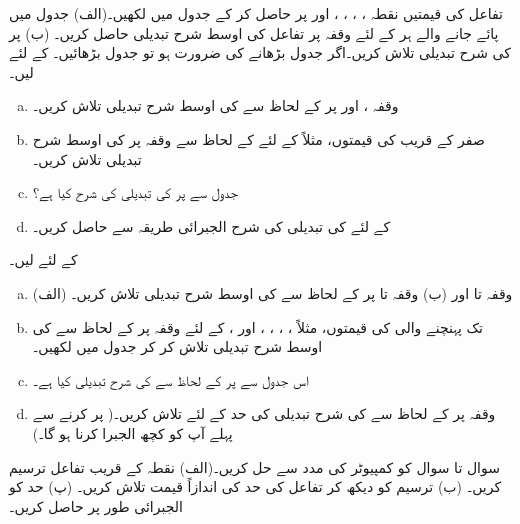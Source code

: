 تفاعل  کی قیمتیں نقطہ ، ، ، ،  اور  پر  حاصل کر کے جدول میں لکھیں۔(الف) جدول میں پائے جانے والے ہر  کے لئے وقفہ  پر تفاعل کی اوسط شرح تبدیلی حاصل کریں۔ (ب)  پر  کی شرح تبدیلی تلاش کریں۔اگر جدول بڑھانے کی ضرورت ہو تو جدول بڑھائیں۔ 
 کے لئے  لیں۔
\begin{enumerate}[a.]
\item
وقفہ ،  اور  پر  کے  لحاظ سے  کی اوسط شرح تبدیلی تلاش کریں۔
\item
صفر کے قریب  کی قیمتوں، مثلاً  کے لئے  کے لحاظ سے وقفہ  پر  کی اوسط شرح تبدیلی تلاش کریں۔
\item
جدول سے  پر  کی تبدیلی کی شرح کیا ہے؟
\item
{} کے لئے  کی تبدیلی کی شرح الجبرائی طریقہ سے حاصل کریں۔
\end{enumerate}
 کے لئے  لیں۔
\begin{enumerate}[a.]
\item
(الف) وقفہ  تا  اور  (ب) وقفہ  تا  پر  کے لحاظ سے  کی اوسط شرح تبدیلی تلاش کریں۔ 
\item
{} تک پہنچنے والی  کی قیمتوں، مثلاً ، ، ، ،  اور ، کے لئے وقفہ  پر  کے لحاظ سے  کی اوسط شرح تبدیلی تلاش کر کر جدول میں لکھیں۔
\item
اس جدول سے  پر  کے لحاظ سے  کی شرح تبدیلی کیا ہے۔
\item
وقفہ  پر  کے لحاظ سے  کی شرح تبدیلی کی حد  کے لئے  تلاش کریں۔( پر کرنے سے پہلے آپ کو کچھ الجبرا کرنا ہو گا۔)
\end{enumerate}
سوال  تا سوال  کو کمپیوٹر کی مدد سے حل کریں۔(الف) نقطہ  کے قریب تفاعل ترسیم کریں۔ (ب) ترسیم کو دیکھ کر تفاعل کی حد کی اندازاً قیمت تلاش کریں۔ (پ) حد کو الجبرائی طور پر حاصل کریں۔


